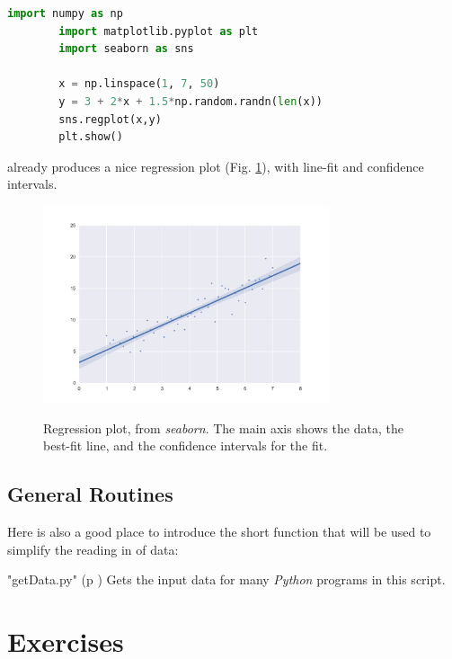 \begin{lstlisting}[language=Python]
        import numpy as np
        import matplotlib.pyplot as plt
        import seaborn as sns

        x = np.linspace(1, 7, 50)
        y = 3 + 2*x + 1.5*np.random.randn(len(x))
        sns.regplot(x,y)
        plt.show()
\end{lstlisting}

already produces a nice regression plot (Fig. \ref{fig:seaborn}), with line-fit and confidence intervals.

\begin{figure}[ht]
  \centering
  \includegraphics[width=0.75\textwidth]{../Images/regplot.png}\\
  \caption{Regression plot, from \emph{seaborn}. The main axis shows the data, the best-fit line, and the confidence intervals for the fit.}
  \label{fig:seaborn}
\end{figure}

\subsection{General Routines}
Here is also a good place to introduce the short function that will be used to simplify the reading in of data:

\PyImg "getData.py" (p \pageref{py:getData}) Gets the input data for many \emph{Python} programs in this script.

\section{Exercises}

